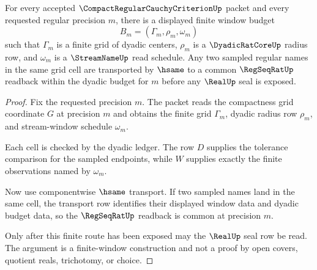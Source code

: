 \begin{theorem}
\label{thm:compact-regular-cauchy-criterion-modulus-window}
For every accepted $\CompactRegularCauchyCriterionUp$ packet and every requested regular precision $m$, there is a displayed finite window budget
$$
B_m=(\Gamma_m,\rho_m,\omega_m)
$$
such that $\Gamma_m$ is a finite grid of dyadic centers, $\rho_m$ is a $\DyadicRatCoreUp$ radius row, and $\omega_m$ is a $\StreamNameUp$ read schedule. Any two sampled regular names in the same grid cell are transported by $\hsame$ to a common $\RegSeqRatUp$ readback within the dyadic budget for $m$ before any $\RealUp$ seal is exposed.
\end{theorem}
\begin{proof}
Fix the requested precision $m$. The packet reads the compactness grid coordinate $G$ at precision $m$ and obtains the finite grid $\Gamma_m$, dyadic radius row $\rho_m$, and stream-window schedule $\omega_m$.

Each cell is checked by the dyadic ledger. The row $D$ supplies the tolerance comparison for the sampled endpoints, while $W$ supplies exactly the finite observations named by $\omega_m$.

Now use componentwise $\hsame$ transport. If two sampled names land in the same cell, the transport row identifies their displayed window data and dyadic budget data, so the $\RegSeqRatUp$ readback is common at precision $m$.

Only after this finite route has been exposed may the $\RealUp$ seal row be read. The argument is a finite-window construction and not a proof by open covers, quotient reals, trichotomy, or choice.
\end{proof}

